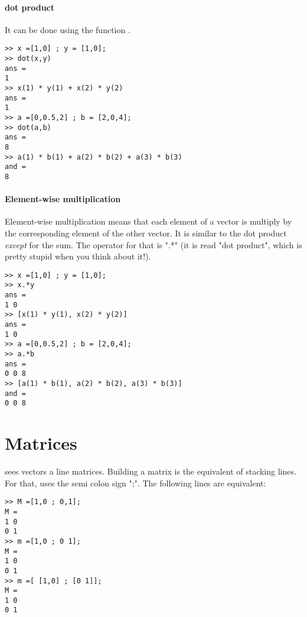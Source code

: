 \paragraph{dot product}
It can be done using the function .
\begin{lstlisting}
>> x =[1,0] ; y = [1,0];
>> dot(x,y)
ans = 
1
>> x(1) * y(1) + x(2) * y(2)
ans =
1
>> a =[0,0.5,2] ; b = [2,0,4];
>> dot(a,b)
ans = 
8
>> a(1) * b(1) + a(2) * b(2) + a(3) * b(3)    
and =
8
\end{lstlisting}



\paragraph{Element-wise multiplication}
Element-wise multiplication means that each element of a vector is multiply by the corresponding element of the other vector.
It is similar to the dot product \emph{except} for the sum.
The operator for that is ".*" (it is read "dot product", which is pretty stupid when you think about it!).

\begin{lstlisting}
>> x =[1,0] ; y = [1,0];
>> x.*y
ans = 
1 0
>> [x(1) * y(1), x(2) * y(2)]
ans =
1 0
>> a =[0,0.5,2] ; b = [2,0,4];
>> a.*b
ans = 
0 0 8
>> [a(1) * b(1), a(2) * b(2), a(3) * b(3)]
and =
0 0 8
\end{lstlisting}





\section{Matrices}
\matlab sees vectors a line matrices. Building a matrix is the equivalent of stacking lines.
For that, \matlab uses the semi colon sign ";".
The following lines are equivalent:
\begin{lstlisting}
>> M =[1,0 ; 0,1];
M = 
1 0
0 1
>> m =[1,0 ; 0 1];
M = 
1 0
0 1
>> m =[ [1,0] ; [0 1]];
M = 
1 0
0 1
\end{lstlisting}

